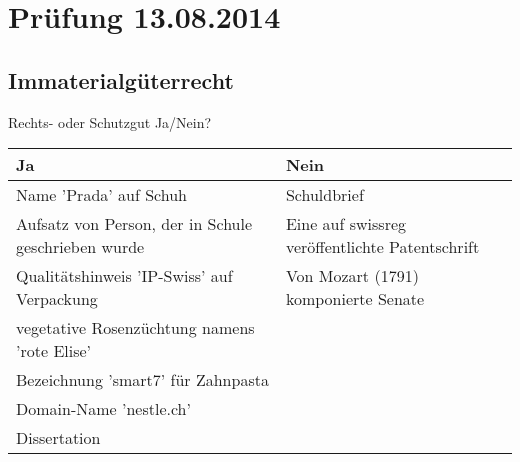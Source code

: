 \section{Prüfung 13.08.2014}
\subsection{Immaterialgüterrecht}
Rechts- oder Schutzgut Ja/Nein?\\
\begin{tabular}{|l|l|}
	\hline 
	\textbf{Ja} & \textbf{Nein} \\ 
	\hline 
	Name 'Prada' auf Schuh & Schuldbrief \\ 
	\hline 
	Aufsatz von Person, der in Schule geschrieben wurde & Eine auf swissreg veröffentlichte Patentschrift \\
	\hline
	Qualitätshinweis 'IP-Swiss' auf Verpackung & Von Mozart (1791) komponierte Senate \\
	\hline
	vegetative Rosenzüchtung namens 'rote Elise' &  \\
	\hline
	Bezeichnung 'smart7' für Zahnpasta &  \\
	\hline
	Domain-Name 'nestle.ch' &  \\
	\hline
	Dissertation &  \\
	\hline
\end{tabular}

